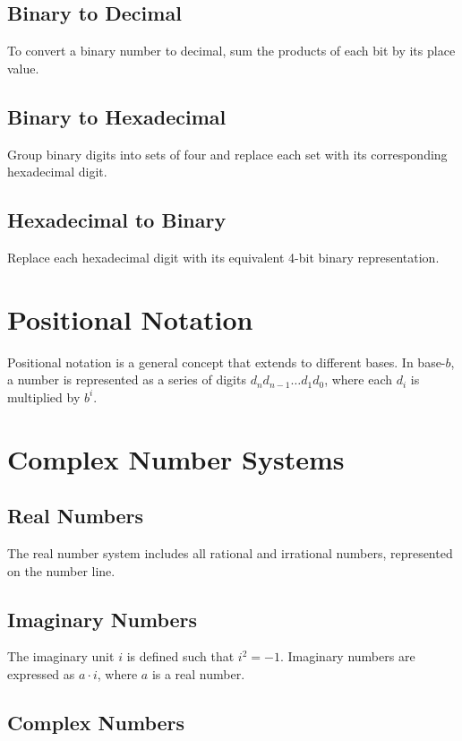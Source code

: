 \documentclass{article}
\begin{document}
\subsection{Binary to Decimal}

To convert a binary number to decimal, sum the products of each bit by its place value.

\subsection{Binary to Hexadecimal}

Group binary digits into sets of four and replace each set with its corresponding hexadecimal digit.

\subsection{Hexadecimal to Binary}

Replace each hexadecimal digit with its equivalent 4-bit binary representation.

\section{Positional Notation}

Positional notation is a general concept that extends to different bases. In base-$b$, a number is represented as a series of digits $d_n d_{n-1} \ldots d_1 d_0$, where each $d_i$ is multiplied by $b^i$.

\section{Complex Number Systems}

\subsection{Real Numbers}

The real number system includes all rational and irrational numbers, represented on the number line.

\subsection{Imaginary Numbers}

The imaginary unit $i$ is defined such that $i^2 = -1$. Imaginary numbers are expressed as $a \cdot i$, where $a$ is a real number.

\subsection{Complex Numbers}
\end{document}
